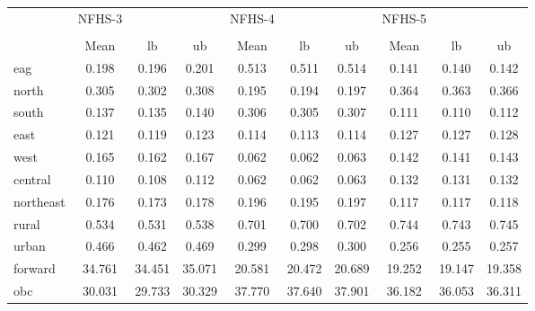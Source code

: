 {
\def\sym#1{\ifmmode^{#1}\else\(^{#1}\)\fi}
\begin{tabular}{l*{3}{ccc}}
\hline\hline
                    &      NFHS-3&            &            &      NFHS-4&            &            &      NFHS-5&            &            \\
                    &\multicolumn{3}{c}{}                  &\multicolumn{3}{c}{}                  &\multicolumn{3}{c}{}                  \\
                    &        Mean&          lb&          ub&        Mean&          lb&          ub&        Mean&          lb&          ub\\
\hline
eag                 &       0.198&       0.196&       0.201&       0.513&       0.511&       0.514&       0.141&       0.140&       0.142\\
north               &       0.305&       0.302&       0.308&       0.195&       0.194&       0.197&       0.364&       0.363&       0.366\\
south               &       0.137&       0.135&       0.140&       0.306&       0.305&       0.307&       0.111&       0.110&       0.112\\
east                &       0.121&       0.119&       0.123&       0.114&       0.113&       0.114&       0.127&       0.127&       0.128\\
west                &       0.165&       0.162&       0.167&       0.062&       0.062&       0.063&       0.142&       0.141&       0.143\\
central             &       0.110&       0.108&       0.112&       0.062&       0.062&       0.063&       0.132&       0.131&       0.132\\
northeast           &       0.176&       0.173&       0.178&       0.196&       0.195&       0.197&       0.117&       0.117&       0.118\\
rural               &       0.534&       0.531&       0.538&       0.701&       0.700&       0.702&       0.744&       0.743&       0.745\\
urban               &       0.466&       0.462&       0.469&       0.299&       0.298&       0.300&       0.256&       0.255&       0.257\\
forward             &      34.761&      34.451&      35.071&      20.581&      20.472&      20.689&      19.252&      19.147&      19.358\\
obc                 &      30.031&      29.733&      30.329&      37.770&      37.640&      37.901&      36.182&      36.053&      36.311\\

\end{tabular}}
